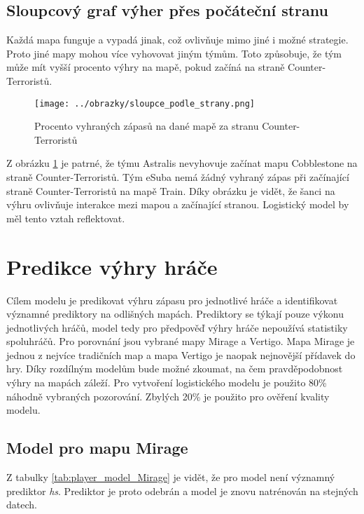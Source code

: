 \newpage
{\color{red}
\subsection{Sloupcový graf výher přes počáteční stranu}
Každá mapa funguje a vypadá jinak, což ovlivňuje mimo jiné i možné strategie. Proto jiné mapy mohou více vyhovovat jiným týmům. Toto způsobuje, že
tým může mít vyšší procento výhry na mapě, pokud začíná na straně Counter-Terroristů.

\begin{figure}[H]
    \centering
    \texttt{[image: ../obrazky/sloupce\_podle\_strany.png]}
    \caption{Procento vyhraných zápasů na dané mapě za stranu Counter-Terroristů} 
    \label{fig:sloupcovy_graf_strany}
\end{figure}

Z obrázku \ref{fig:sloupcovy_graf_strany} je patrné, že týmu Astralis nevyhovuje začínat mapu Cobblestone na straně Counter-Terroristů. Tým eSuba nemá žádný vyhraný zápas
při začínající straně Counter-Terroristů na mapě Train. Díky obrázku je vidět, že šanci na výhru ovlivňuje interakce mezi mapou a začínající stranou. Logistický model
by měl tento vztah reflektovat. 
}

\section{Predikce výhry hráče}
{\color{red}
Cílem modelu je predikovat výhru zápasu pro jednotlivé hráče a identifikovat významné prediktory na odlišných mapách.
}
Prediktory se týkají pouze výkonu jednotlivých hráčů, model tedy pro předpověď výhry hráče nepoužívá statistiky spoluhráčů. Pro porovnání jsou vybrané mapy Mirage a Vertigo.
Mapa Mirage je jednou z nejvíce tradičních map a mapa Vertigo je naopak nejnovější přídavek do hry. Díky rozdílným modelům bude možné zkoumat, na čem pravděpodobnost výhry na 
mapách záleží. Pro vytvoření logistického modelu je použito 80\% náhodně vybraných pozorování. Zbylých 20\% je použito pro
{\color{red}
ověření kvality modelu.
}

\subsection{Model pro mapu Mirage}



{\color{red}
Z tabulky \ref{tab:player_model_Mirage} je vidět, že pro model není významný prediktor \textit{hs}. Prediktor je proto odebrán a model je znovu natrénován na stejných datech.
}

